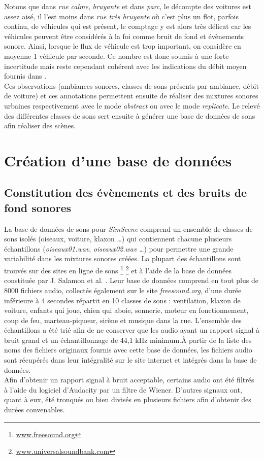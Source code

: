 Notons que dans \textit{rue calme}, \textit{bruyante} et dans \textit{parc}, le décompte des voitures est assez aisé, il l'est moins dans \textit{rue très bruyante} où c'est plus un flot, parfois continu, de véhicules qui est présent, le comptage y est alors très délicat car les véhicules peuvent être considérés à la foi comme bruit de fond et évènements sonore. Ainsi, lorsque le flux de véhicule est trop important, on considère en moyenne 1 véhicule par seconde. Ce nombre est donc soumis à une forte incertitude mais reste cependant cohérent avec les indications du débit moyen fournis dans \cite{aumond_modelling_2017}.\\

Ces observations (ambiances sonores, classes de sons présents par ambiance, débit de voiture) et ces annotations permettent ensuite de réaliser des mixtures sonores urbaines respectivement avec le mode \textit{abstract} ou avec le mode \textit{replicate}. Le relevé des différentes classes de sons sert ensuite à générer une base de données de sons afin réaliser des scènes.

\section{Création d'une base de données}

\subsection{Constitution des évènements et des bruits de fond sonores}

La base de données de sons pour \textit{SimScene} comprend un ensemble de classes de sons isolés (oiseaux, voiture, klaxon  \dots) qui contiennent chacune plusieurs échantillons (\textit{oiseaux01.wav}, \textit{oiseaux02.wav} \dots) pour permettre une grande variabilité dans les mixtures sonores créées. La plupart des échantillons sont trouvés sur des sites en ligne de sons \footnote{\url{www.freesound.org}} \footnote{\url{www.universalsoundbank.com}} et à l'aide de la base de données constituée par J. Salamon et al. \cite{salamon_dataset_nodate}. Leur base de données comprend en tout plus de 8000 fichiers audio, collectés également sur le site \textit{freesound.org}, d'une durée inférieure à 4 secondes répartit en 10 classes de sons : ventilation, klaxon de voiture, enfants qui joue, chien qui aboie, sonnerie, moteur en fonctionnement, coup de feu, marteau-piqueur, sirène et musique dans la rue. L'ensemble des échantillons a été trié afin de ne conserver que les audio ayant un rapport signal à bruit grand et un échantillonnage de 44,1 kHz minimum.\`A partir de la liste des noms des fichiers originaux fournis avec cette base de données, les fichiers audio sont récupérés dans leur intégralité sur le site internet et intégrés dans la base de données.\\
Afin d'obtenir un rapport signal à bruit acceptable, certains audio ont été filtrés à l'aide du logiciel d'Audacity par un filtre de Wiener. D'autres signaux ont, quant à eux, été tronqués ou bien divisés en plusieurs fichiers afin d'obtenir des durées convenables. 
 
